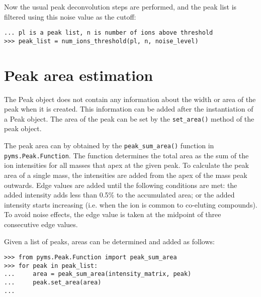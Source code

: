 Now the usual peak deconvolution steps are performed, and the peak list is filtered
using this noise value as the cutoff:

\begin{verbatim}
... pl is a peak list, n is number of ions above threshold
>>> peak_list = num_ions_threshold(pl, n, noise_level)
\end{verbatim}


\section{Peak area estimation}


The Peak object does not contain any information about the width or area of the
peak when it is created. This information can be added after the instantiation
of a Peak object. The area of the peak can be set by the {\tt set\_area()}
method of the peak object.

The peak area can by obtained by the {\tt peak\_sum\_area()} function in {\tt
pyms.Peak.Function}. The function determines the total
area as the sum of the ion intensities for all masses that apex at the given
peak. To calculate the peak area of a single mass, the intensities are added
from the apex of the mass peak outwards. Edge values are added until the
following conditions are met: the added intensity adds less than 0.5\% to the
accumulated area; or the added intensity starts increasing (i.e. when the ion is
common to co-eluting compounds). To avoid noise effects, the edge value is taken
at the midpoint of three consecutive edge values.

Given a list of peaks, areas can be determined and added as follows:
\begin{verbatim}
>>> from pyms.Peak.Function import peak_sum_area
>>> for peak in peak_list:
...     area = peak_sum_area(intensity_matrix, peak)
...     peak.set_area(area)
...
\end{verbatim}

